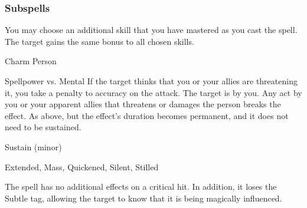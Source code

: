 \subsubsection{Subspells}
You may choose an additional skill that you have mastered as you cast the spell.
The target gains the same bonus to all chosen skills.
\begin{spellsection}{Charm Person}
\begin{spellheader}
\end{spellheader}
\begin{spellcontent}
\begin{spelltargetinginfo}
\end{spelltargetinginfo}
\begin{spelleffects}
\begin{spellattack}{Spellpower vs. Mental}
\spellspecial If the target thinks that you or your allies are threatening it, you take a  penalty to accuracy on the attack.
\spellsuccess
The target is \charmed by you.
Any act by you or your apparent allies that threatens or damages the  person breaks the effect.
\spellcritical As above, but the effect's duration becomes permanent, and it does not need to be sustained.
\end{spellattack}
\spelldur Sustain (minor)
\end{spelleffects}
\end{spellcontent}
\begin{spellfooter}
 Extended, Mass, Quickened, Silent, Stilled
\end{spellfooter}
\begin{spellsubcontent}
\begin{spellcantrip}
The spell has no additional effects on a critical hit.
In addition, it loses the Subtle tag, allowing the target to know that it is being magically influenced.
\end{spellcantrip}
\end{spellsubcontent}
\end{spellsection}
